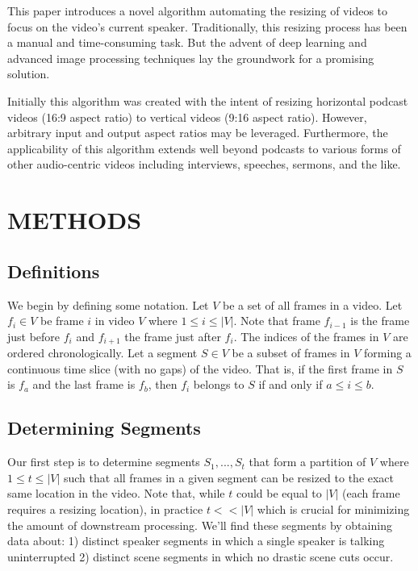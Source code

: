 \documentclass{article}
\begin{document}
This paper introduces a novel algorithm automating the resizing of videos to focus on the video's current speaker. Traditionally, this resizing process has been a manual and time-consuming task. But the advent of deep learning and advanced image processing techniques lay the groundwork for a promising solution.

Initially this algorithm was created with the intent of resizing horizontal podcast videos (16:9 aspect ratio) to vertical videos (9:16 aspect ratio). However, arbitrary input and output aspect ratios may be leveraged. Furthermore, the applicability of this algorithm extends well beyond podcasts to various forms of other audio-centric videos including interviews, speeches, sermons, and the like.

\section{METHODS}
\label{sec:pagestyle}

\subsection{Definitions}
We begin by defining some notation. Let $V$ be a set of all frames in a video. Let $f_i \in V$ be frame $i$ in video $V$ where $1 \le i \le |V|$. Note that frame $f_{i-1}$ is the frame just before $f_i$ and $f_{i+1}$ the frame just after $f_i$. The indices of the frames in $V$ are ordered chronologically. Let a segment $S \in V$ be a subset of frames in $V$ forming a continuous time slice (with no gaps) of the video. That is, if the first frame in $S$ is $f_a$ and the last frame is $f_b$, then $f_i$ belongs to $S$ if and only if $a \le i \le b$.

\subsection{Determining Segments}
\label{ssec:determining-segments}
Our first step is to determine segments $S_1, ..., S_t$ that form a partition of $V$ where $1 \le t \le |V|$ such that all frames in a given segment can be resized to the exact same location in the video. Note that, while $t$ could be equal to $|V|$ (each frame requires a resizing location), in practice $t << |V|$ which is crucial for minimizing the amount of downstream processing. We'll find these segments by obtaining data about: 1) distinct speaker segments in which a single speaker is talking uninterrupted 2) distinct scene segments in which no drastic scene cuts occur.
\end{document}
